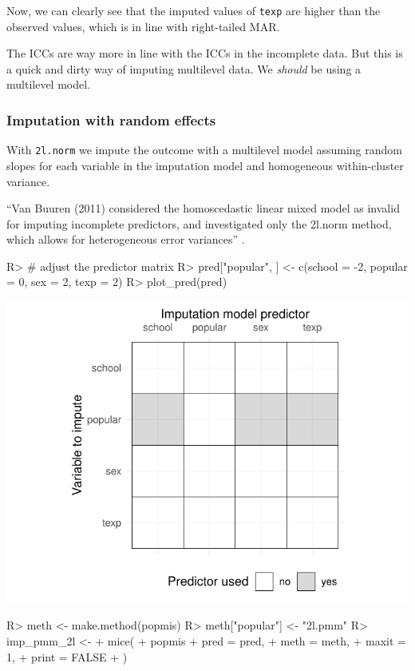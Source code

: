 \documentclass[
]{jss}
\begin{document}
Now, we can clearly see that the imputed values of \texttt{texp} are
higher than the observed values, which is in line with right-tailed MAR.

The ICCs are way more in line with the ICCs in the incomplete data. But
this is a quick and dirty way of imputing multilevel data. We
\emph{should} be using a multilevel model.

\hypertarget{imputation-with-random-effects}{%
\subsubsection{Imputation with random
effects}\label{imputation-with-random-effects}}

With \texttt{2l.norm} we impute the outcome with a multilevel model
assuming random slopes for each variable in the imputation model and
homogeneous within-cluster variance.

``Van Buuren (2011) considered the homoscedastic linear mixed model as
invalid for imputing incomplete predictors, and investigated only the
2l.norm method, which allows for heterogeneous error variances''
\citep{buur18}.

\begin{CodeChunk}
\begin{CodeInput}
R> # adjust the predictor matrix
R> pred["popular", ] <- c(school = -2, popular = 0, sex = 2, texp = 2) 
R> plot_pred(pred) 
\end{CodeInput}


\begin{center}\includegraphics{Imputation_of_Incomplete_Multilevel_Data_files/figure-latex/pop_norm-1} \end{center}

\begin{CodeInput}
R> meth <- make.method(popmis)
R> meth["popular"] <- "2l.pmm"
R> imp_pmm_2l <-
+   mice(
+     popmis %
+     pred = pred,
+     meth = meth,
+     maxit = 1,
+     print = FALSE
+   )
\end{CodeInput}
\end{CodeChunk}
\end{document}
